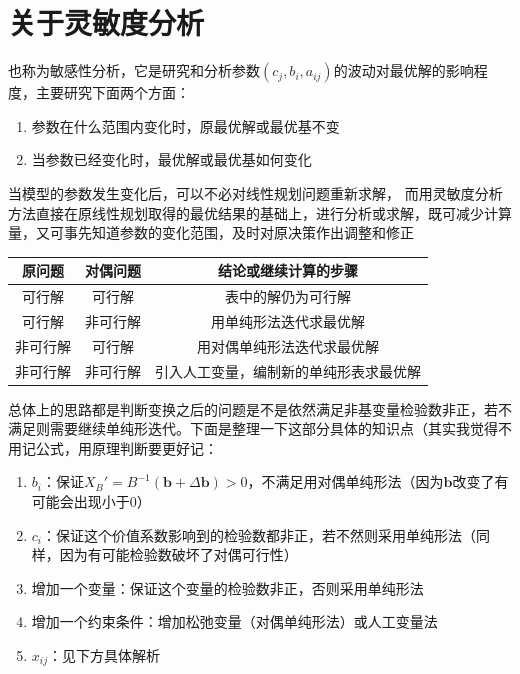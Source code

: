 \documentclass[]{report}
\begin{document}
	\section{关于灵敏度分析}
		也称为敏感性分析，它是研究和分析参数$(c_j,b_i,a_{ij})$的波动对最优解的影响程度，主要研究下面两个方面：\par
		\begin{enumerate}
			\item 参数在什么范围内变化时，原最优解或最优基不变
			\item 当参数已经变化时，最优解或最优基如何变化
		\end{enumerate}\par
		当模型的参数发生变化后，可以不必对线性规划问题重新求解， 而用灵敏度分析方法直接在原线性规划取得的最优结果的基础上，进行分析或求解，既可减少计算量，又可事先知道参数的变化范围，及时对原决策作出调整和修正\par
		\begin{table}[h]
			\centering
			\begin{tabular}{ccc}
				\toprule
				原问题 & 对偶问题 & 结论或继续计算的步骤\\
				\midrule
				可行解   & 可行解   & 表中的解仍为可行解\\
				可行解   & 非可行解 & 用单纯形法迭代求最优解\\
				非可行解 & 可行解   & 用对偶单纯形法迭代求最优解\\
				非可行解 & 非可行解 & 引入人工变量，编制新的单纯形表求最优解\\
				\bottomrule
			\end{tabular}
		\end{table}\par
		总体上的思路都是判断变换之后的问题是不是依然满足非基变量检验数非正，若不满足则需要继续单纯形迭代。下面是整理一下这部分具体的知识点（其实我觉得不用记公式，用原理判断要更好记：\par
		\begin{enumerate}
			\item $b_i$：保证$X_B'=B^{-1}(\boldsymbol{b}+\Delta\boldsymbol{b})>0$，不满足用对偶单纯形法（因为$\boldsymbol{b}$改变了有可能会出现小于0）
			\item $c_i$：保证这个价值系数影响到的检验数都非正，若不然则采用单纯形法（同样，因为有可能检验数破坏了对偶可行性）
			\item 增加一个变量：保证这个变量的检验数非正，否则采用单纯形法
			\item 增加一个约束条件：增加松弛变量（对偶单纯形法）或人工变量法
			\item $x_{ij}$：见下方具体解析
		\end{enumerate}
\end{document}
